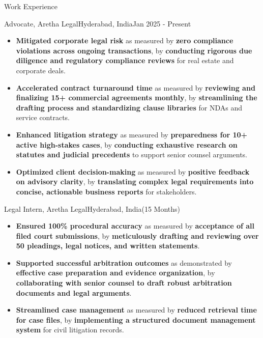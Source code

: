 \documentclass{resume} %
\begin{document}
\begin{rSection}{Work Experience}
\begin{rSubsection}
{Advocate, \textnormal{Aretha Legal}}{Hyderabad, India}{Jan 2025 - Present}{}
\begin{itemize}[left=-1.5em, labelsep=.1cm, labelwidth=.2cm, itemsep=0.0em]
\item \textbf{Mitigated corporate legal risk} as measured by \textbf{zero compliance violations across ongoing transactions}, by \textbf{conducting rigorous due diligence and regulatory compliance reviews} for real estate and corporate deals.
\item \textbf{Accelerated contract turnaround time} as measured by \textbf{reviewing and finalizing 15+ commercial agreements monthly}, by \textbf{streamlining the drafting process and standardizing clause libraries} for NDAs and service contracts.
\item \textbf{Enhanced litigation strategy} as measured by \textbf{preparedness for 10+ active high-stakes cases}, by \textbf{conducting exhaustive research on statutes and judicial precedents} to support senior counsel arguments.
\item \textbf{Optimized client decision-making} as measured by \textbf{positive feedback on advisory clarity}, by \textbf{translating complex legal requirements into concise, actionable business reports} for stakeholders.
\end{itemize}
\end{rSubsection}

\begin{rSubsection}
{Legal Intern, \textnormal{Aretha Legal}}{Hyderabad, India}{(15 Months)}{}

\begin{itemize}[left=-1.5em, labelsep=.1cm, labelwidth=.2cm, itemsep=0.0em]
\item \textbf{Ensured 100\% procedural accuracy} as measured by \textbf{acceptance of all filed court submissions}, by \textbf{meticulously drafting and reviewing over 50 pleadings, legal notices, and written statements}.
\item \textbf{Supported successful arbitration outcomes} as demonstrated by \textbf{effective case preparation and evidence organization}, by \textbf{collaborating with senior counsel to draft robust arbitration documents and legal arguments}.
\item \textbf{Streamlined case management} as measured by \textbf{reduced retrieval time for case files}, by \textbf{implementing a structured document management system} for civil litigation records.
\end{itemize}
\end{rSubsection}

\end{rSection}
\vspace{0.25em}
\end{document}
